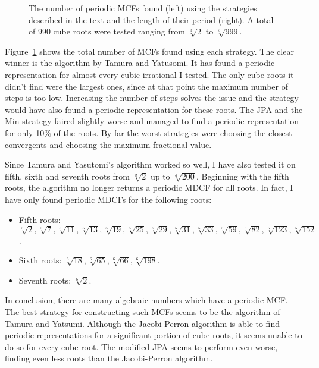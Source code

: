 \begin{figure}[tbp]
  \centering
  
  \caption{
    The number of periodic MCFs found (left) using the strategies described in the
    text and the length of their period (right).
    A total of $990$ cube roots were tested ranging from $\sqrt[3]{2}$ to $\sqrt[3]{999}$.
  }
  \label{fig:comparison}
\end{figure}

Figure~\ref{fig:comparison} shows the total number of MCFs found using each strategy.
The clear winner is the algorithm by Tamura and Yatusomi.
It has found a periodic representation for almost every cubic irrational I tested.
The only cube roots it didn't find were the largest ones,
since at that point the maximum number of steps is too low.
Increasing the number of steps solves the issue and the strategy would have
also found a periodic representation for these roots.
The JPA and the Min strategy faired slightly worse and managed to find a
periodic representation for only 10\% of the roots.
By far the worst strategies were choosing the closest convergents and choosing
the maximum fractional value.


Since Tamura and Yasutomi's algorithm worked so well,
I have also tested it on fifth, sixth and seventh roots
from $\sqrt[d]{2}$ up to $\sqrt[d]{200}$.
Beginning with the fifth roots, the algorithm no longer returns a periodic MDCF for all roots.
In fact, I have only found periodic MDCFs for the following roots:
\begin{itemize}
  \item Fifth roots:
    $\sqrt[5]{2}, \sqrt[5]{7}, \sqrt[5]{11}, \sqrt[5]{13}, \sqrt[5]{19},
    \sqrt[5]{25}, \sqrt[5]{29}, \sqrt[5]{31}, \sqrt[5]{33}, \sqrt[5]{59},
    \sqrt[5]{82}, \sqrt[5]{123}, \sqrt[5]{152}$.
  \item Sixth roots: $\sqrt[6]{18}, \sqrt[6]{65}, \sqrt[6]{66},\sqrt[6]{198}$.
  \item Seventh roots: $\sqrt[6]{2}$.
\end{itemize}

In conclusion,
there are many algebraic numbers which have a periodic MCF.
The best strategy for constructing such MCFs seems to be the algorithm of Tamura and Yatsumi.
Although the Jacobi-Perron algorithm is able to find periodic representations
for a significant portion of cube roots, it seems unable to do so for every
cube root.
The modified JPA seems to perform even worse, finding even less roots than the
Jacobi-Perron algorithm.

